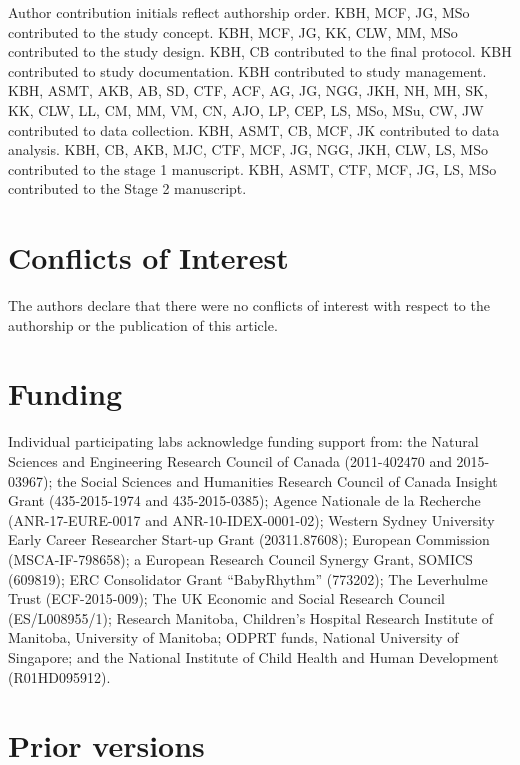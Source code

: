 \documentclass[
  english,
  ,man,floatsintext]{apa6}
\begin{document}
Author contribution initials reflect authorship order. KBH, MCF, JG, MSo contributed to the study concept. KBH, MCF, JG, KK, CLW, MM, MSo contributed to the study design. KBH, CB contributed to the final protocol. KBH contributed to study documentation. KBH contributed to study management. KBH, ASMT, AKB, AB, SD, CTF, ACF, AG, JG, NGG, JKH, NH, MH, SK, KK, CLW, LL, CM, MM, VM, CN, AJO, LP, CEP, LS, MSo, MSu, CW, JW contributed to data collection. KBH, ASMT, CB, MCF, JK contributed to data analysis. KBH, CB, AKB, MJC, CTF, MCF, JG, NGG, JKH, CLW, LS, MSo contributed to the stage 1 manuscript. KBH, ASMT, CTF, MCF, JG, LS, MSo contributed to the Stage 2 manuscript.

\hypertarget{conflicts-of-interest}{%
\section{Conflicts of Interest}\label{conflicts-of-interest}}

The authors declare that there were no conflicts of interest with respect to the authorship or the publication of this article.

\hypertarget{funding}{%
\section{Funding}\label{funding}}

Individual participating labs acknowledge funding support from: the Natural Sciences and Engineering Research Council of Canada (2011-402470 and 2015-03967); the Social Sciences and Humanities Research Council of Canada Insight Grant (435-2015-1974 and 435-2015-0385); Agence Nationale de la Recherche (ANR-17-EURE-0017 and ANR-10-IDEX-0001-02); Western Sydney University Early Career Researcher Start-up Grant (20311.87608); European Commission (MSCA-IF-798658); a European Research Council Synergy Grant, SOMICS (609819); ERC Consolidator Grant \enquote{BabyRhythm} (773202); The Leverhulme Trust (ECF-2015-009); The UK Economic and Social Research Council (ES/L008955/1); Research Manitoba, Children's Hospital Research Institute of Manitoba, University of Manitoba; ODPRT funds, National University of Singapore; and the National Institute of Child Health and Human Development (R01HD095912).

\hypertarget{prior-versions}{%
\section{Prior versions}\label{prior-versions}}
\end{document}
